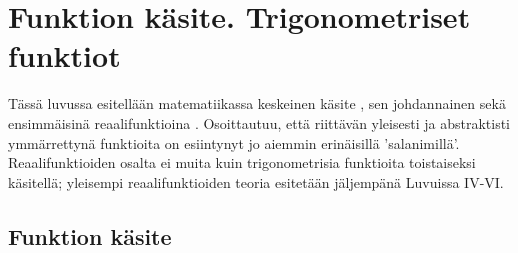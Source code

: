 \section{Funktion käsite. Trigonometriset funktiot} \label{trigonometriset funktiot}
\alku

Tässä luvussa esitellään matematiikassa keskeinen käsite , sen johdannainen
 sekä ensimmäisinä reaalifunktioina .
Osoittautuu, että riittävän yleisesti ja abstraktisti ymmärrettynä  funktioita on esiintynyt
jo aiemmin erinäisillä 'salanimillä'. Reaalifunktioiden osalta ei muita kuin trigonometrisia
funktioita toistaiseksi käsitellä; yleisempi reaalifunktioiden teoria esitetään jäljempänä
Luvuissa IV-VI.

\subsection{Funktion käsite}

